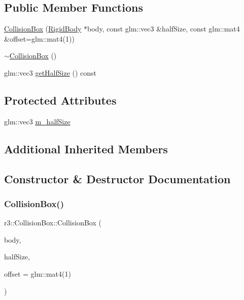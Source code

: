 \subsection*{Public Member Functions}
\begin{DoxyCompactItemize}
\item 
\mbox{\hyperlink{classr3_1_1_collision_box_ae8fd5f7a2fa804313c988f8b13866b91}{Collision\+Box}} (\mbox{\hyperlink{classr3_1_1_rigid_body}{Rigid\+Body}} $\ast$body, const glm\+::vec3 \&half\+Size, const glm\+::mat4 \&offset=glm\+::mat4(1))
\item 
\mbox{\hyperlink{classr3_1_1_collision_box_aab1d8f1b7999c61cff10b631305cc4f3}{$\sim$\+Collision\+Box}} ()
\item 
glm\+::vec3 \mbox{\hyperlink{classr3_1_1_collision_box_a6d35bfc27fd291409cb5e90ae2464179}{get\+Half\+Size}} () const
\end{DoxyCompactItemize}
\subsection*{Protected Attributes}
\begin{DoxyCompactItemize}
\item 
glm\+::vec3 \mbox{\hyperlink{classr3_1_1_collision_box_a91a3eaa48b16d7b0ca52ebadf4830bc8}{m\+\_\+half\+Size}}
\end{DoxyCompactItemize}
\subsection*{Additional Inherited Members}


\subsection{Constructor \& Destructor Documentation}
\mbox{\label{classr3_1_1_collision_box_ae8fd5f7a2fa804313c988f8b13866b91}} 
\subsubsection{\texorpdfstring{Collision\+Box()}{CollisionBox()}}
{\footnotesize\ttfamily r3\+::\+Collision\+Box\+::\+Collision\+Box (\begin{DoxyParamCaption}\item[{\mbox{\hyperlink{classr3_1_1_rigid_body}{Rigid\+Body}} $\ast$}]{body,  }\item[{const glm\+::vec3 \&}]{half\+Size,  }\item[{const glm\+::mat4 \&}]{offset = {\ttfamily glm\+:\+:mat4(1)} }\end{DoxyParamCaption})\hspace{0.3cm}{\ttfamily [explicit]}}

